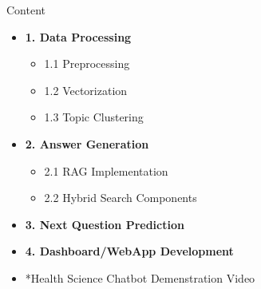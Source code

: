 \documentclass{beamer}
\begin{document}
	\begin{frame}{Content}
	\begin{itemize}
		\item \textbf{1. Data Processing}
		\begin{itemize}
			\item 1.1 Preprocessing
			\item 1.2 Vectorization
			\item 1.3 Topic Clustering
		\end{itemize}
		
		\item \textbf{2. Answer Generation}
		\begin{itemize}
			\item 2.1 RAG Implementation
			\item 2.2 Hybrid Search Components
		\end{itemize}
		
		\item \textbf{3. Next Question Prediction}
		
		\item \textbf{4. Dashboard/WebApp Development}
		
		\vspace{0.09234cm}
		\item \large{*Health Science Chatbot Demenstration Video}
	\end{itemize}
	\end{frame}
	
\end{document}
